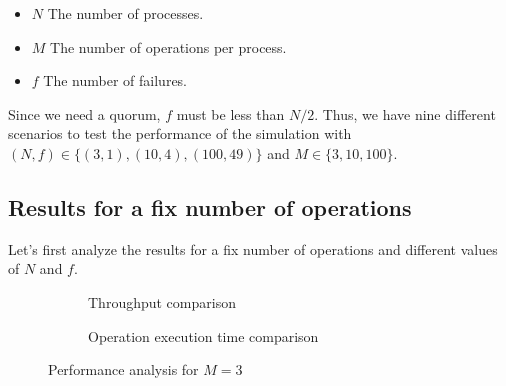 \documentclass{article}
\begin{document}
\begin{itemize}
    \item $N$ The number of processes.
    \item $M$ The number of operations per process.
    \item $f$ The number of failures.
\end{itemize}

Since we need a quorum, $f$ must be less than $N/2$. Thus,
we have nine different scenarios to test the performance of the simulation
with $(N,f) \in \{(3,1),(10,4),(100,49)\}$ and $M \in \{3,10,100\}$.


\subsection{Results for a fix number of operations}
Let's first analyze the results for a fix number of operations and different values of $N$ and $f$.


\begin{figure}[h!]
    \centering
    \begin{subfigure}{0.55\textwidth}
    \caption{Throughput comparison }
\end{subfigure}%
\begin{subfigure}{.55\textwidth}
    \caption{Operation execution time comparison}
\end{subfigure}

\caption{Performance analysis for \( M = 3 \)}
\end{figure}
\end{document}
